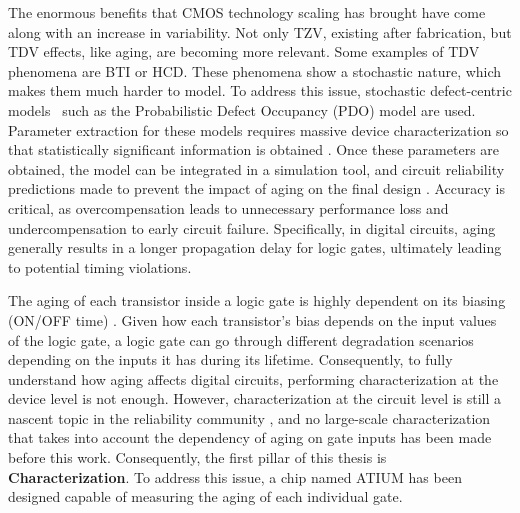 The enormous benefits that CMOS technology scaling has brought have come along with an increase in variability. Not only \gls{TZV}, existing after fabrication, but \gls{TDV} effects, like aging, are becoming more relevant. Some examples of \gls{TDV} phenomena are \gls{BTI} or \gls{HCD}. These phenomena show a stochastic nature, which makes them much harder to model. To address this issue, stochastic defect-centric models~\cite{grasserParadigmShiftUnderstanding2011, reisingerUnderstandingModelingAC2011, kaczerDefectcentricPerspectiveDevice2015} such as the Probabilistic Defect Occupancy (PDO) model \cite{martin-martinezProbabilisticDefectOccupancy2011} are used. Parameter extraction for these models requires massive device characterization so that statistically significant information is obtained \cite{saraza-canflancaDeterminationTimeConstant2022}. Once these parameters are obtained, the model can be integrated in a simulation tool, and circuit reliability predictions made to prevent the impact of aging on the final design \cite{amrouchMLRescueReliability2023,klemmeMachineLearningCircuit2021,klemmeScalableMachineLearning2022a,klemmeEfficientLearningStrategies2022}. Accuracy is critical, as overcompensation leads to unnecessary performance loss and undercompensation to early circuit failure. Specifically, in digital circuits, aging generally results in a longer propagation delay for logic gates, ultimately leading to potential timing violations.

The aging of each transistor inside a logic gate is highly dependent on its biasing (ON/OFF time) \cite{vansantenNewWorstcaseTiming2019, santana-andreoImpactBTIHCI2022}. Given how each transistor's bias depends on the input values of the logic gate, a logic gate can go through different degradation scenarios depending on the inputs it has during its lifetime. Consequently, to fully understand how aging affects digital circuits, performing characterization at the device level is not enough. However, characterization at the circuit level is still a nascent topic in the reliability community \cite{santana-andreoCharacterizingAgingDegradation2022, saraza-canflancaSmartSRAMCellArray2022}, and no large-scale characterization that takes into account the dependency of aging on gate inputs has been made before this work. Consequently, the first pillar of this thesis is \textbf{Characterization}. To address this issue, a chip named ATIUM has been designed capable of measuring the aging of each individual gate. 

